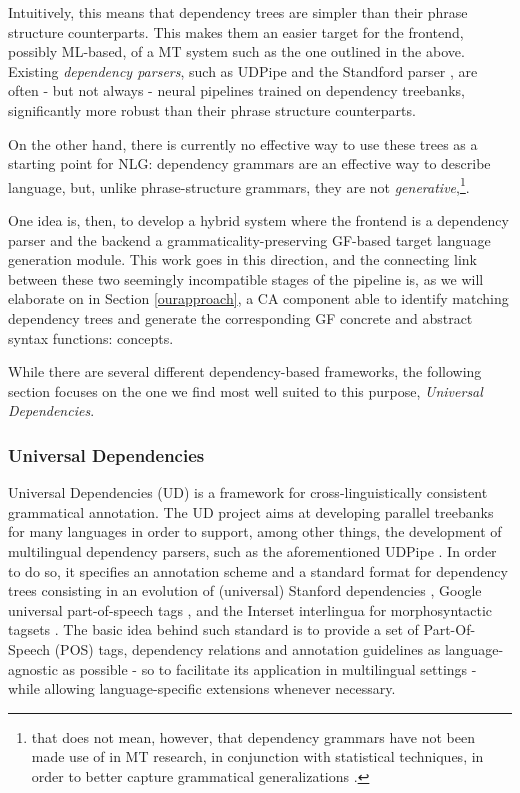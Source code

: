 Intuitively, this means that dependency trees are simpler than their phrase structure counterparts. This makes them an easier target for the frontend, possibly ML-based, of a MT system such as the one outlined in the above. 
Existing \textit{dependency parsers}, such as UDPipe \cite{udpipe1} and the Standford parser \cite{standford}, are often - but not always \cite{rasp} - neural pipelines trained on dependency treebanks, significantly more robust than their phrase structure counterparts. 

On the other hand, there is currently no effective way to use these trees as a starting point for NLG: dependency grammars are an effective way to describe language, but, unlike phrase-structure grammars, they are not \textit{generative},\footnote{that does not mean, however, that dependency grammars have not been made use of in MT research, in conjunction with statistical techniques, in order to better capture grammatical generalizations \cite{treelet}.}. \smallskip

One idea is, then, to develop a hybrid system where the frontend is a dependency parser and the backend a grammaticality-preserving GF-based target language generation module. 
This work goes in this direction, and the connecting link between these two seemingly incompatible stages of the pipeline is, as we will elaborate on in Section \ref{ourapproach}, a CA component able to identify matching dependency trees and generate the corresponding GF concrete and abstract syntax functions: concepts.

While there are several different dependency-based frameworks, the following section focuses on the one we find most well suited to this purpose, \textit{Universal Dependencies}. 

\subsubsection{Universal Dependencies} \label{ud} 
Universal Dependencies (UD) is a framework for cross-linguistically consistent grammatical annotation. 
The UD project aims at developing parallel treebanks for many languages in order to support, among other things, the development of multilingual dependency parsers, such as the aforementioned UDPipe \cite{udpipe1}. 
In order to do so, it specifies an annotation scheme and a standard format for dependency trees consisting in an evolution of (universal) Stanford dependencies \cite{st1, st2}, Google universal part-of-speech tags \cite{upos}, and the Interset interlingua for morphosyntactic tagsets \cite{tagconv}. 
The basic idea behind such standard is to provide a set of Part-Of-Speech (POS) tags, dependency relations and annotation guidelines as language-agnostic as possible - so to facilitate its application in multilingual settings - while allowing language-specific extensions whenever necessary. \smallskip

